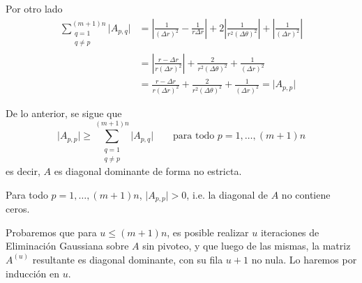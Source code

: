 \begin{itemize}
                Por otro lado
                    \[ \begin{split}
                        \sum_{\substack{q=1 \\ q \neq p}}^{(m+1)n} \vert A_{p,q} \vert &= \left \vert \frac{1}{(\Delta r)^2} - \frac{1}{r \Delta r} \right \vert + 2 \left \vert \frac{1}{r^2 (\Delta \theta)^2} \right \vert + \left \vert \frac{1}{(\Delta r)^2} \right \vert \\
                        &= \left \vert \frac{r - \Delta r}{r (\Delta r)^2} \right \vert + \frac{2}{r^2 (\Delta \theta)^2} + \frac{1}{(\Delta r)^2} \\
                        &= \frac{r - \Delta r}{r (\Delta r)^2} + \frac{2}{r^2 (\Delta \theta)^2} + \frac{1}{(\Delta r)^2} = \vert A_{p,p} \vert
                    \end{split} \]
            \end{itemize}

            De lo anterior, se sigue que
                \[ \vert A_{p,p} \vert \geq \sum_{\substack{q=1 \\ q \neq p}}^{(m+1)n} \vert A_{p,q} \vert \qquad \text{para todo $p = 1, \dots, (m+1)n$} \]
            es decir, $A$ es diagonal dominante de forma no estricta.

            \begin{obs}
            \label{obs:Diagonal de A sin ceros}
            Para todo $p = 1, \dots, (m+1)n$, $\vert A_{p,p} \vert > 0$, i.e. la diagonal de $A$ no contiene ceros.
            \end{obs}

            Probaremos que para $u \leq (m+1)n$, es posible realizar $u$ iteraciones de Eliminación Gaussiana sobre $A$ sin pivoteo, y que luego de las mismas, la matriz $A^{(u)}$ resultante es diagonal dominante, con su fila $u + 1$ no nula. Lo haremos por inducción en $u$.

